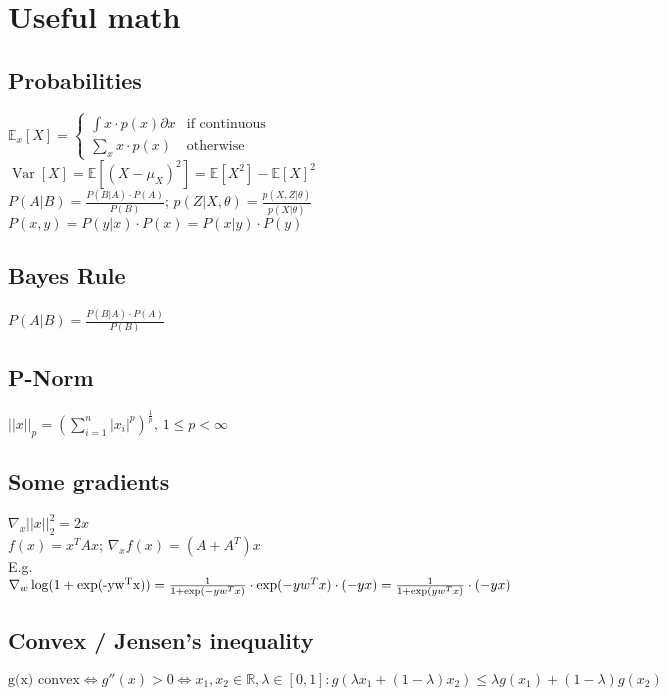 \section*{Useful math}

\subsection*{Probabilities}
$\mathbb{E}_x[X] = \begin{cases}
   \int x \cdot p(x) \partial x  & \text{if continuous}\\
   \sum_x x \cdot p(x) & \text{otherwise}
  \end{cases}$\\
$\operatorname{Var}[X] = \mathbb{E}[(X-\mu_X)^2] = \mathbb{E}[X^2] - \mathbb{E}[X]^2$\\
$P(A|B) = \frac{P(B|A) \cdot P(A)}{P(B)}$; $p(Z|X,\theta) = \frac{p(X,Z|\theta)}{p(X|\theta)}$\\
$P(x,y) = P(y|x) \cdot  P(x) = P(x|y) \cdot P(y)$

\subsection*{{Bayes Rule}}
$P(A|B) = \frac{P(B|A) \cdot P(A)}{P(B)}$

\subsection*{P-Norm}
$||x||_p = (\sum_{i=1}^n|x_i|^p)^{\frac{1}{p}}$, $1 \leq p < \infty$

\subsection*{Some gradients}
$\nabla_x ||x||_2^2 = 2 x$\\
$f(x) = x^T A x$; $\nabla_x f(x) = (A + A^T) x$\\
E.g. $\nabla_w \operatorname{log}(1+\operatorname{exp(-y w^T x)}) = \\
\frac{1}{1+\operatorname{exp}(-y w^T x)} \cdot \operatorname{exp}(-y w^T x) \cdot (-y x) = \\
\frac{1}{1 + \operatorname{exp}(y w^T x)} \cdot(-yx)$\\


\subsection*{Convex / Jensen's inequality}
$\text{g(x) convex} \Leftrightarrow g''(x) > 0 \Leftrightarrow x_1,x_2 \in \mathbb{R}, \lambda \in [0,1]: 
g(\lambda x_1 + (1-\lambda) x_2) \leq \lambda g(x_1) + (1-\lambda) g(x_2)$


